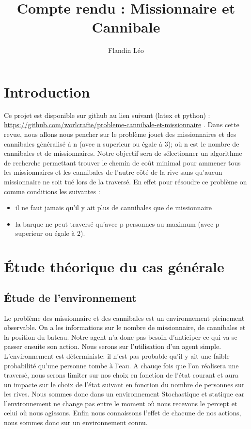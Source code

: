 \documentclass[a4paper, 12pt, french,oneside]{book}
\title{Compte rendu : Missionnaire et Cannibale}
\author{Flandin Léo}
\begin{document}
\maketitle
\tableofcontents

\mainmatter

\chapter{Introduction}
Ce projet est disponible sur github au lien suivant (latex et python) : \url{https://github.com/worlcrafte/probleme-cannibale-et-missionnaire} .
Dans cette revue, nous allons nous pencher sur le problème jouet des missionnaires et des cannibales généralisé à n (avec n superieur ou égale à 3); où n est le nombre de cannibales et de missionnaires. Notre objectif sera de sélectionner un algorithme de recherche permettant trouver le chemin de coût minimal pour ammener tous les missionnaires et les cannibales de l'autre côté de la rive sans qu'aucun missionnaire ne soit tué lors de la traversé. En effet pour résoudre ce problème on comme conditions les suivantes :
\begin{itemize}
    \item il ne faut jamais qu'il y ait plus de cannibales que de missionnaire
    \item la barque ne peut traversé qu'avec p personnes au maximum (avec p superieur ou égale à 2).
\end{itemize}
\chapter{Étude théorique du cas générale}

\section{Étude de l'environnement}
Le problème des missionnaire et des cannibales est un environnement pleinement observable. On a les informations sur le nombre de missionnaire, de cannibales et la position du bateau. Notre agent n'a donc pas besoin d'anticiper ce qui va se passer ensuite son action. Nous serons sur l'utilisation d'un agent simple. L'environnement est déterministe: il n'est pas probable qu'il y ait une faible probabilité qu'une personne tombe à l'eau. A chauqe fois que l'on réalisera une traversé, nous serons limiter sur nos choix en fonction de l'état courant et aura un impacte sur le choix de l'état suivant en fonction du nombre de personnes sur les rives. Nous sommes donc dans un environnement Stochastique et statique car l'environnement ne change pas entre le moment où nous recevons le percept et celui où nous agissons. Enfin nous connaissons l'effet de chacune de nos actions, nous sommes donc sur un environnement connu.
\end{document}
